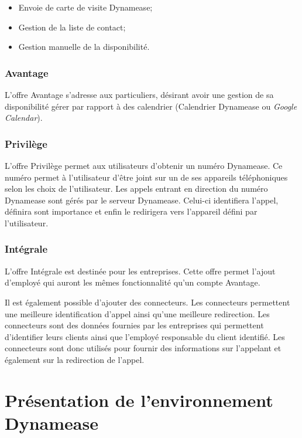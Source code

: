 \begin{itemize}
	\item Envoie de carte de visite Dynamease;
	\item Gestion de la liste de contact;
	\item Gestion manuelle de la disponibilité.
\end{itemize}

\subsubsection{Avantage}

L'offre Avantage s'adresse aux particuliers, désirant avoir une gestion de sa disponibilité gérer par rapport à des calendrier (Calendrier Dynamease ou \textit{Google Calendar}).

\subsubsection{Privilège}

L'offre Privilège permet aux utilisateurs d'obtenir un numéro Dynamease. Ce numéro permet à l'utilisateur d'être joint sur un de ses appareils téléphoniques selon les choix de l'utilisateur. Les appels entrant en direction du numéro Dynamease sont gérés par le serveur Dynamease. Celui-ci identifiera l'appel, définira sont importance et enfin le redirigera vers l'appareil défini par l'utilisateur.

\subsubsection{Intégrale}

L'offre Intégrale est destinée pour les entreprises. Cette offre permet l'ajout d'employé qui auront les mêmes fonctionnalité qu'un compte Avantage.

Il est également possible d'ajouter des connecteurs. Les connecteurs permettent une meilleure identification d'appel ainsi qu'une meilleure redirection. Les connecteurs sont des données fournies par les entreprises qui permettent d'identifier leurs clients ainsi que l'employé responsable du client identifié. Les connecteurs sont donc utilisés pour fournir des informations sur l'appelant et également sur la redirection de l'appel.

\section{Présentation de l'environnement Dynamease}

